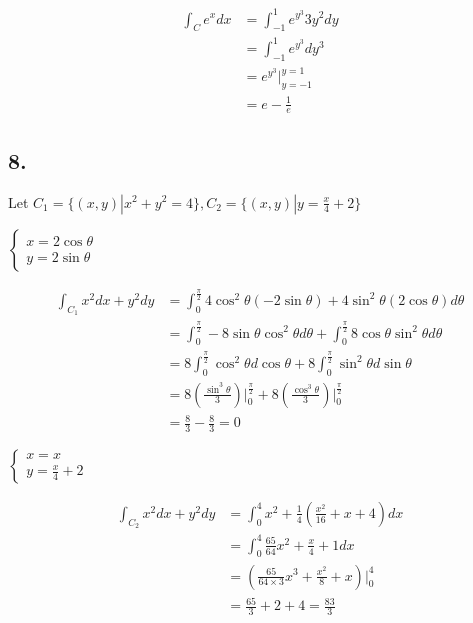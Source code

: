 \documentclass{article}
\begin{document}
  $$\begin{aligned}
    \int_C e^x dx &= \int_{-1}^1 e^{y^3} 3y^2 dy \\
    &= \int_{-1}^1 e^{y^3} dy^3 \\
    &= e^{y^3}\biggl|_{y=-1}^{y=1} \\
    &= e - \frac 1 e
  \end{aligned}$$

  \subsection*{8. }

  Let $C_1 = \{ (x, y) | x^2 + y^2 = 4\}, C_2 = \{ (x, y) | y = \frac x 4 + 2 \}$

  $\left\{ \begin{array}{ll}
    x = 2\cos \theta \\ y = 2\sin \theta
  \end{array}\right.$

  $$\begin{aligned}
    \int_{C_1} x^2 dx + y^2 dy &= \int_{0}^{\frac \pi 2} 4\cos^2 \theta (-2\sin \theta) + 4\sin^2 \theta (2\cos \theta) d\theta \\
    &= \int_0^{\frac \pi 2} -8\sin \theta \cos^2 \theta d\theta + \int_0^{\frac \pi 2}8\cos \theta \sin^2 \theta d\theta \\
    &= 8\int_0^{\frac \pi 2} \cos^2 \theta d\cos \theta + 8 \int_0^{\frac \pi 2} \sin^2 \theta d\sin \theta \\
    &= 8(\frac{\sin^3 \theta}{3})\biggl|_0^{\frac \pi 2} + 8(\frac{\cos^3 \theta}{3})\biggl|_0^{\frac \pi 2} \\
    &= \frac 8 3 - \frac 8 3 = 0
  \end{aligned}$$
  
  $\left\{ \begin{array}{ll}
    x = x \\ y = \frac x 4 + 2
  \end{array}\right.$

  $$\begin{aligned}
    \int_{C_2} x^2 dx + y^2 dy &= \int_0^4 x^2 + \frac 1 4(\frac{x^2}{16} + x + 4) dx \\
    &= \int_0^4 \frac{65}{64} x^2 + \frac x 4 + 1 dx \\
    &= (\frac{65}{64 \times 3}x^3 + \frac{x^2}{8} + x)\biggl|_0^4 \\
    &= \frac{65}{3} + 2 + 4 = \frac{83}{3}
  \end{aligned}$$
\end{document}
